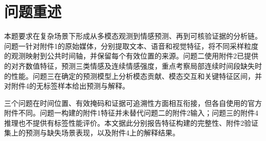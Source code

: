 \section*{问题重述}
本题要求在复杂场景下形成从多模态观测到情感预测、再到可核验证据的分析链。问题一针对附件1的原始媒体，分别提取文本、语音和视觉特征，将不同采样粒度的观测映射到公共时间轴，并保留每个有效位置的来源。问题二使用附件2已提供的对齐数值特征，预测三类情感及连续情感强度，重点考察局部连续时间段缺失时的性能。问题三在确定的预测模型上分析模态贡献、模态交互和关键特征区间，并对附件4的无标签样本给出预测与解释。

三个问题在时间位置、有效掩码和证据可追溯性方面相互衔接，但各自使用的官方附件不同。问题一构建的附件1特征并未替代问题二的附件2输入；问题三的附件4推理也不提供有标签性能评价。本文据此分别报告特征构建的完整性、附件2验证集上的预测与缺失场景表现，以及附件4上的解释结果。
